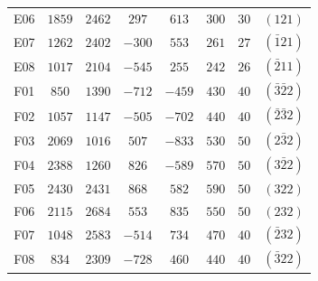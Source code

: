 \begin{table}[H]
\begin{tabular}{c|c|c|c|c|c|c|c}
        E06 & $1859$ & $2462$ & $ 297$ & $ 613$ & $300$ & $30$ & $(121)$ \\
        E07 & $1262$ & $2402$ & $-300$ & $ 553$ & $261$ & $27$ & $(\bar{1}21)$ \\
        E08 & $1017$ & $2104$ & $-545$ & $ 255$ & $242$ & $26$ & $(\bar{2}11)$ \\
        F01 & $ 850$ & $1390$ & $-712$ & $-459$ & $430$ & $40$ & $(\bar{3}\bar{2}2)$ \\
        F02 & $1057$ & $1147$ & $-505$ & $-702$ & $440$ & $40$ & $(\bar{2}\bar{3}2)$ \\
        F03 & $2069$ & $1016$ & $ 507$ & $-833$ & $530$ & $50$ & $(2\bar{3}2)$ \\
        F04 & $2388$ & $1260$ & $ 826$ & $-589$ & $570$ & $50$ & $(3\bar{2}2)$ \\
        F05 & $2430$ & $2431$ & $ 868$ & $ 582$ & $590$ & $50$ & $(322)$ \\
        F06 & $2115$ & $2684$ & $ 553$ & $ 835$ & $550$ & $50$ & $(232)$ \\
        F07 & $1048$ & $2583$ & $-514$ & $ 734$ & $470$ & $40$ & $(\bar{2}32)$ \\
        F08 & $ 834$ & $2309$ & $-728$ & $ 460$ & $440$ & $40$ & $(\bar{3}22)$                
    \end{tabular}\label{tab:miller2}
\end{table}